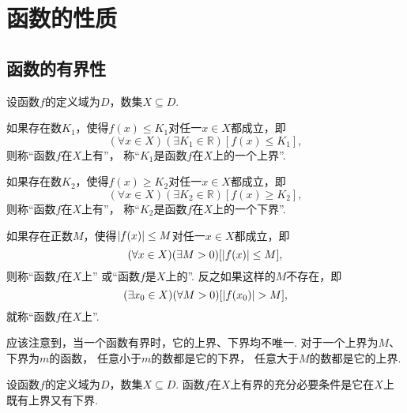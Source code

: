 \section{函数的性质}
\subsection{函数的有界性}
\begin{definition}\label{definition:函数.函数的有界性}
设函数\(f\)的定义域为\(D\)，数集\(X \subseteq D\).

如果存在数\(K_1\)，使得\(f(x) \leq K_1\)对任一\(x \in X\)都成立，即\[
	(\forall x \in X)
	(\exists K_1 \in \mathbb{R})
	[f(x) \leq K_1],
\]
则称“函数\(f\)在\(X\)上有”，
称“\(K_1\)是函数\(f\)在\(X\)上的一个上界”.

如果存在数\(K_2\)，使得\(f(x) \geq K_2\)对任一\(x \in X\)都成立，即\[
	(\forall x \in X)
	(\exists K_2 \in \mathbb{R})
	[f(x) \geq K_2],
\]
则称“函数\(f\)在\(X\)上有”，
称“\(K_2\)是函数\(f\)在\(X\)上的一个下界”.

如果存在正数\(M\)，使得\(\abs{f(x)} \leq M\)对任一\(x \in X\)都成立，即\[
	(\forall x \in X)
	(\exists M>0)[
		\abs{f(x)} \leq M
	],
\]
则称“函数\(f\)在\(X\)上”
或“函数\(f\)是\(X\)上的”.
反之如果这样的\(M\)不存在，即\[
	(\exists x_0 \in X)
	(\forall M>0)[
		\abs{f(x_0)} > M
	],
\]
就称“函数\(f\)在\(X\)上”.
\end{definition}

应该注意到，当一个函数有界时，它的上界、下界均不唯一.
对于一个上界为\(M\)、下界为\(m\)的函数，
任意小于\(m\)的数都是它的下界，
任意大于\(M\)的数都是它的上界.

\begin{theorem}
设函数\(f\)的定义域为\(D\)，数集\(X \subseteq D\).
函数\(f\)在\(X\)上有界的充分必要条件是它在\(X\)上既有上界又有下界.
\end{theorem}

